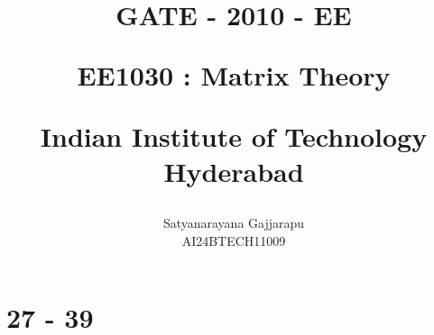 \documentclass[journal]{IEEEtran}
\begin{document}

\vspace{3cm}




\title{
GATE - 2010 - EE

\large{EE1030 : Matrix Theory}

Indian Institute of Technology Hyderabad
}
\author{Satyanarayana Gajjarapu

AI24BTECH11009
}	





\maketitle




\bigskip

\renewcommand{\thefigure}{\theenumi}
\renewcommand{\thetable}{\theenumi}


\section{27 - 39}
\end{document}
